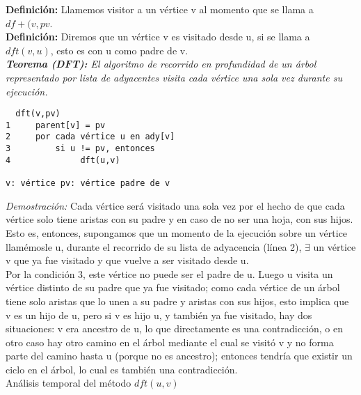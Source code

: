 \documentclass[12pt]{article}
\begin{document}
\textbf{Definición:} Llamemos visitor a un v\'ertice v al momento que se llama a $df + (v,pv$.\\

\textbf{Definición:} Diremos que un v\'ertice v es visitado desde u, si se llama a $dft (v,u)$, esto es con u como padre de v.\\

\textit{\textbf {Teorema (DFT):} El algoritmo de recorrido en profundidad de un \'arbol representado por lista de adyacentes visita cada v\'ertice una sola vez durante
su ejecuci\'on.}\\

\begin{verbatim}
  dft(v,pv)
1     parent[v] = pv
2     por cada vértice u en ady[v]
3         si u != pv, entonces
4              dft(u,v)

v: vértice pv: vértice padre de v          
\end{verbatim}



\textit{Demostración:} Cada v\'ertice ser\'a visitado una sola vez por el hecho de que cada v\'ertice solo tiene aristas con su padre y en caso de no ser
una hoja, con sus hijos.\\

Esto es, entonces, supongamos que un momento de la ejecuci\'on sobre un v\'ertice llam\'emosle u, durante el recorrido de su lista de adyacencia (l\'inea 2),
$\exists$ un v\'ertice v que ya fue visitado y que vuelve a ser visitado desde u.\\

Por la condici\'on 3, este v\'ertice no puede ser el padre de u. Luego u visita un v\'ertice distinto de su padre que ya fue visitado;  como cada
v\'ertice de un \'arbol tiene solo aristas que lo unen a su padre y aristas con sus hijos, esto implica que v es un hijo de u, pero si v es hijo u,
y tambi\'en ya fue visitado, hay dos situaciones: v era ancestro de u, lo que directamente es una contradicci\'on, o en otro caso hay otro camino
en el \'arbol mediante el cual se visit\'o v y no forma parte del camino hasta u (porque no es ancestro); entonces tendr\'ia que existir un ciclo
en el \'arbol, lo cual es tambi\'en una contradicci\'on.\\

An\'alisis temporal del m\'etodo $dft(u,v)$\\
\end{document}
